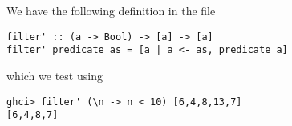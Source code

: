 
We have the following definition in the file 
\scriptsize\begin{verbatim}
filter' :: (a -> Bool) -> [a] -> [a]
filter' predicate as = [a | a <- as, predicate a]
\end{verbatim}\normalsize
which we test using
\scriptsize\begin{verbatim}
ghci> filter' (\n -> n < 10) [6,4,8,13,7]
[6,4,8,7]
\end{verbatim}\normalsize

